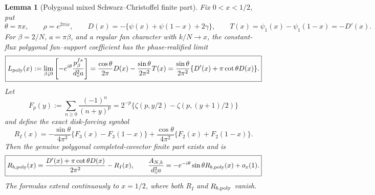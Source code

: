 \documentclass[11pt]{amsart}
\numberwithin{equation}{section}
\newtheorem{lemma}[theorem]{Lemma}
\theoremstyle{definition}
\theoremstyle{remark}
\begin{document}
\begin{lemma}[Polygonal mixed Schwarz--Christoffel finite part]
\label{JC:lem:regular-polygonal-mixed-finite-part}
Fix $0<x<1/2$, put
\[
 \theta=\pi x,\qquad \rho=e^{2\pi ix},\qquad
 D(x)=-\{\psi(x)+\psi(1-x)+2\gamma\},
 \qquad T(x)=\psi_1(x)-\psi_1(1-x)=-D'(x).
\]
For $\beta=2/N$, $a=\pi\beta$, and a regular fan character with
$k/N\to x$, the constant-flux polygonal fan--support coefficient has the
phase-realified limit
\begin{equation}\label{JC:eq:regular-polygonal-mixed-finite-part}
 \boxed{
 L_{\rm poly}(x):=
 \lim_{\beta\downarrow0}
 \left[-e^{i\theta}\frac{p^{fs}_\beta}{d_\circ^2a}\right]
 =\frac{\cos\theta}{2\pi}D(x)
 -\frac{\sin\theta}{2\pi^2}T(x)
 =\frac{\sin\theta}{2\pi^2}
 \{D'(x)+\pi\cot\theta D(x)\}.}
\end{equation}
Let
\[
 F_p(y):=\sum_{n\ge0}\frac{(-1)^n}{(n+y)^p}
 =2^{-p}\{\zeta(p,y/2)-\zeta(p,(y+1)/2)\}
\]
and define the exact disk-forcing symbol
\begin{equation}\label{JC:eq:regular-disk-forcing-finite-part}
 R_I(x)=-\frac{\sin\theta}{4\pi^3}
 \{F_3(x)-F_3(1-x)\}
 +\frac{\cos\theta}{4\pi^2}
 \{F_2(x)+F_2(1-x)\}.
\end{equation}
Then the genuine polygonal completed-covector finite part exists and is
\begin{equation}\label{JC:eq:regular-completed-covector-finite-part}
 \boxed{
 R_{b,{\rm poly}}(x)=
 \frac{D'(x)+\pi\cot\theta D(x)}{2\pi^2}-R_I(x),
 \qquad
 \frac{A_{N,k}}{d_\circ^2a}
 =-e^{-i\theta}\sin\theta R_{b,{\rm poly}}(x)+o_x(1).}
\end{equation}
The formulas extend continuously to $x=1/2$, where both
$R_I$ and $R_{b,{\rm poly}}$ vanish.
\end{lemma}
\end{document}
